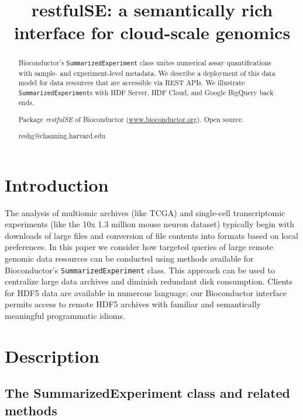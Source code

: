 \documentclass[applications]{gen-bioinformatics}
\author[1]{\pfnm{Shweta}
  \pinit{}
  \psnm{Gopaulakrishnan}}
\author[1]{\pfnm{Samuela}
  \pinit{}
  \psnm{Pollack}}
\author[1]{\pfnm{Benjamin}
  \pinit{}
  \psnm{Stubbs}}
\author[1]{\pfnm{Vincent}
  \pinit{J}
  \psnm{Carey}}
\newcommand{\Rpackage}[1]{{\textit{#1}}}
\begin{document}
\title{restfulSE: a semantically rich interface for cloud-scale genomics}
\maketitle

\begin{abstract}
\begin{subabstract}[Summary]
Bioconductor's \verb+SummarizedExperiment+ class
unites numerical assay quantifications with sample- and
experiment-level metadata.  We describe a deployment
of this data model for data resources that are accessible
via REST APIs.  We illustrate \verb+SummarizedExperiment+s with
HDF Server, HDF Cloud, and Google BigQuery back ends.
\end{subabstract}
\begin{subabstract}[Availability] Package \Rpackage{restfulSE} of Bioconductor
 (\url {www.bioconductor.org}). Open source.
\end{subabstract}
\begin{subabstract}[Contact]reshg@channing.harvard.edu
\end{subabstract}
\end{abstract}
\section*{Introduction}

The analysis of multiomic archives (like TCGA) and single-cell
transcriptomic experiments (like the 10x 1.3 million mouse neuron
dataset) typically begin with downloads of large files and
conversion of file contents into formats based on local preferences.
In this paper we consider how targeted queries of large remote
genomic data resources can be conducted using methods available
for Bioconductor's \verb+SummarizedExperiment+ class.
This approach can be used to centralize
large data archives and diminish redundant disk
consumption.  Clients for HDF5 data are available in
numerous language; our Bioconductor interface permits access to
remote HDF5 archives with
familiar and semantically meaningful programmatic idioms.

\section*{Description}

\subsection*{The SummarizedExperiment class and related methods}
\end{document}
